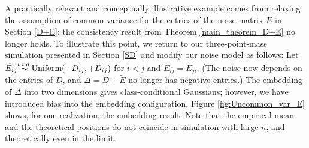 A practically relevant and conceptually illustrative example comes from relaxing the assumption of common variance for the entries of the noise matrix $E$ in Section \ref{D+E}: the consistency result from Theorem \ref{main_theorem_D+E} no longer holds. To illustrate this point, we return to our three-point-mass simulation presented in Section \ref{SD} and modify our noise model as follows: Let $\widetilde{E}_{ij} {\stackrel{i.i.d.}{\sim}} \textrm{Uniform}(-D_{ij}, +D_{ij})$ for $i < j$ and $\widetilde{E}_{ij}= \widetilde{E}_{ji}$. (The noise now depends on the entries of $D$, and $\Delta = D + \widetilde{E}$ no longer has negative entries.) The embedding of $\Delta$ into two dimensions gives class-conditional Gaussians; however, we have introduced bias into the embedding configuration. Figure \ref{fig:Uncommon_var_E} shows, for one realization, the embedding result. Note that the empirical mean and the theoretical positions do not coincide in simulation with large $n$, and theoretically even in the limit.
